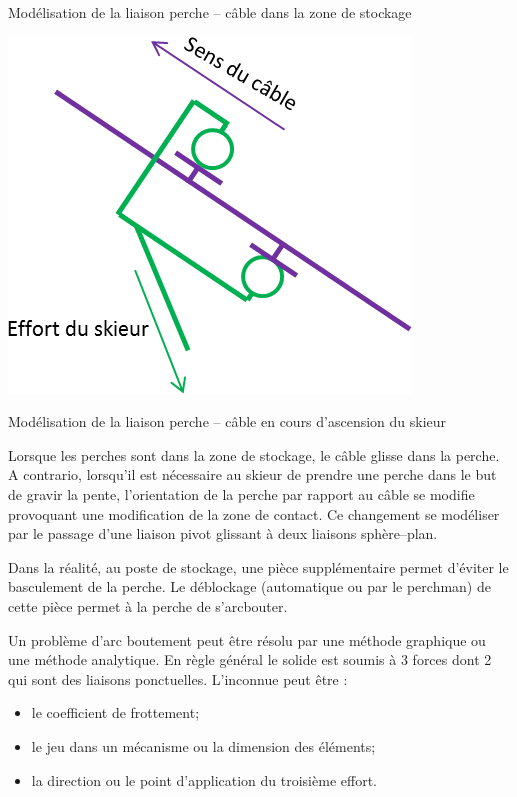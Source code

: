 \documentclass[10pt]{article}
\begin{document}
\begin{exemple}
\begin{center}
\begin{minipage}[c]{.3\linewidth}
\begin{center}
Modélisation de la liaison perche -- câble dans la zone de stockage
\end{center}
\end{minipage}\hfill
\begin{minipage}[c]{.3\linewidth}
\begin{center}
\includegraphics[width=.9\textwidth]{images/arc2}

Modélisation de la liaison perche -- câble en cours d'ascension du skieur
\end{center}
\end{minipage}
\end{center}
\vspace{.5cm}

Lorsque les perches sont dans la zone de stockage, le câble glisse dans la perche. A contrario, lorsqu'il est nécessaire au skieur de prendre une perche dans le but de gravir la pente, l'orientation de la perche par rapport au câble se modifie provoquant une modification de la zone de contact. Ce changement se modéliser par le passage d'une liaison pivot glissant à deux liaisons sphère--plan.

Dans la réalité, au poste de stockage, une pièce supplémentaire permet d'éviter le basculement de la perche. Le déblockage (automatique ou par le perchman) de cette pièce permet à la perche de s'arcbouter. 

\end{exemple}

Un problème d'arc boutement peut être résolu par une méthode graphique ou une méthode analytique. En règle général le solide est soumis à 3 forces dont 2 qui sont des liaisons ponctuelles. 
L'inconnue peut être :
\begin{itemize}
\item le coefficient de frottement;
\item le jeu dans un mécanisme ou la dimension des éléments;
\item la direction ou le point d'application du troisième effort.
\end{itemize}
\end{document}
